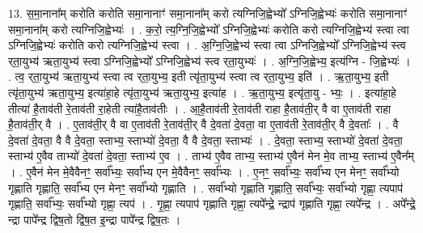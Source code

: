 \documentclass[17pt]{extarticle}
\begin{document}
13. स॒मा॒नाना᳚म् करोति करोति समा॒नानाꣳ॑ समा॒नाना᳚म् करो त्यग्निजि॒ह्वेभ्यो᳚ ऽग्निजि॒ह्वेभ्यः॑ करोति समा॒नानाꣳ॑ समा॒नाना᳚म् करो त्यग्निजि॒ह्वेभ्यः॑ । . क॒रो॒ त्य॒ग्नि॒जि॒ह्वेभ्यो᳚ ऽग्निजि॒ह्वेभ्यः॑ करोति करो त्यग्निजि॒ह्वेभ्य॑ स्त्वा त्वा ऽग्निजि॒ह्वेभ्यः॑ करोति करो त्यग्निजि॒ह्वेभ्य॑ स्त्वा । . अ॒ग्नि॒जि॒ह्वेभ्य॑ स्त्वा त्वा ऽग्निजि॒ह्वेभ्यो᳚ ऽग्निजि॒ह्वेभ्य॑ स्त्व र्‌ता॒युभ्य॑ ऋता॒युभ्य॑ स्त्वा ऽग्निजि॒ह्वेभ्यो᳚ ऽग्निजि॒ह्वेभ्य॑ स्त्व र्‌ता॒युभ्यः॑ । . अ॒ग्नि॒जि॒ह्वेभ्य॒ इत्य॑ग्नि - जि॒ह्वेभ्यः॑ । . त्व॒ र्‌ता॒युभ्य॑ ऋता॒युभ्य॑ स्त्वा त्व र्‌ता॒युभ्य॒ इती त्यृ॑ता॒युभ्य॑ स्त्वा त्व र्‌ता॒युभ्य॒ इति॑ । . ऋ॒ता॒युभ्य॒ इती त्यृ॑ता॒युभ्य॑ ऋता॒युभ्य॒ इत्या॑हा॒हे त्यृ॑ता॒युभ्य॑ ऋता॒युभ्य॒ इत्या॑ह । . ऋ॒ता॒युभ्य॒ इत्यृ॑ता॒यु - भ्यः॒ । . इत्या॑हा॒हे तीत्या॑ है॒ताव॑ती रे॒ताव॑ती रा॒हेती त्या॑है॒ताव॑तीः । . आ॒है॒ताव॑ती रे॒ताव॑ती राहा है॒ताव॑ती॒र् वै वा ए॒ताव॑ती राहा है॒ताव॑ती॒र् वै । . ए॒ताव॑ती॒र् वै वा ए॒ताव॑ती रे॒ताव॑ती॒र् वै दे॒वता॑ दे॒वता॒ वा ए॒ताव॑ती रे॒ताव॑ती॒र् वै दे॒वताः᳚ । . वै दे॒वता॑ दे॒वता॒ वै वै दे॒वता॒ स्ताभ्य॒ स्ताभ्यो॑ दे॒वता॒ वै वै दे॒वता॒ स्ताभ्यः॑ । . दे॒वता॒ स्ताभ्य॒ स्ताभ्यो॑ दे॒वता॑ दे॒वता॒ स्ताभ्य॑ ए॒वैव ताभ्यो॑ दे॒वता॑ दे॒वता॒ स्ताभ्य॑ ए॒व । . ताभ्य॑ ए॒वैव ताभ्य॒ स्ताभ्य॑ ए॒वैन॑ मेन मे॒व ताभ्य॒ स्ताभ्य॑ ए॒वैन᳚म् । . ए॒वैन॑ मेन मे॒वैवैनꣳ॒॒ सर्वा᳚भ्यः॒ सर्वा᳚भ्य एन मे॒वैवैनꣳ॒॒ सर्वा᳚भ्यः । . ए॒नꣳ॒॒ सर्वा᳚भ्यः॒ सर्वा᳚भ्य एन मेनꣳ॒॒ सर्वा᳚भ्यो गृह्णाति गृह्णाति॒ सर्वा᳚भ्य एन मेनꣳ॒॒ सर्वा᳚भ्यो गृह्णाति । . सर्वा᳚भ्यो गृह्णाति गृह्णाति॒ सर्वा᳚भ्यः॒ सर्वा᳚भ्यो गृह्णा॒ त्यपाप॑ गृह्णाति॒ सर्वा᳚भ्यः॒ सर्वा᳚भ्यो गृह्णा॒ त्यप॑ । . गृ॒ह्णा॒ त्यपाप॑ गृह्णाति गृह्णा॒ त्यपे᳚न्द्रे॒ न्द्राप॑ गृह्णाति गृह्णा॒ त्यपे᳚न्द्र । . अपे᳚न्द्रे॒ न्द्रा पापे᳚न्द्र द्विष॒तो द्वि॑ष॒त इ॒न्द्रा पापे᳚न्द्र द्विष॒तः । \newline
\end{document}
